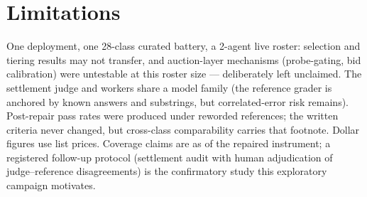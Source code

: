 \documentclass{article}
\begin{document}
\section{Limitations}

One deployment, one 28-class curated battery, a 2-agent live roster: selection and tiering results may not transfer, and auction-layer mechanisms (probe-gating, bid calibration) were untestable at this roster size --- deliberately left unclaimed. The settlement judge and workers share a model family (the reference grader is anchored by known answers and substrings, but correlated-error risk remains). Post-repair pass rates were produced under reworded references; the written criteria never changed, but cross-class comparability carries that footnote. Dollar figures use list prices. Coverage claims are as of the repaired instrument; a registered follow-up protocol (settlement audit with human adjudication of judge--reference disagreements) is the confirmatory study this exploratory campaign motivates.



\end{document}
